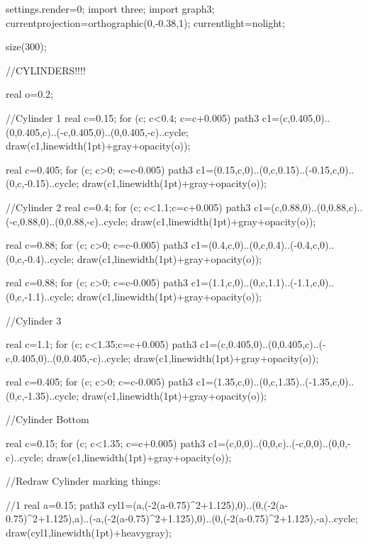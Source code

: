 
  	settings.render=0;
	import three;
    import graph3;
    currentprojection=orthographic(0,-0.38,1);
    currentlight=nolight;

	size(300);
    
    
    //CYLINDERS!!!!
    
    real o=0.2;
    
    //Cylinder 1
   	real c=0.15;
    for (c; c<0.4; c=c+0.005)
    {
        path3 c1=(c,0.405,0)..(0,0.405,c)..(-c,0.405,0)..(0,0.405,-c)..cycle;
    	draw(c1,linewidth(1pt)+gray+opacity(o));
    }
        
   	real c=0.405;
    for (c; c>0; c=c-0.005)
    {
        path3 c1=(0.15,c,0)..(0,c,0.15)..(-0.15,c,0)..(0,c,-0.15)..cycle;
    	draw(c1,linewidth(1pt)+gray+opacity(o));
    }
        
        
     //Cylinder 2
    real c=0.4;
    for (c; c<1.1;c=c+0.005)
    {
        path3 c1=(c,0.88,0)..(0,0.88,c)..(-c,0.88,0)..(0,0.88,-c)..cycle;
    	draw(c1,linewidth(1pt)+gray+opacity(o));
    }
        
   	real c=0.88;
    for (c; c>0; c=c-0.005)
    {
        path3 c1=(0.4,c,0)..(0,c,0.4)..(-0.4,c,0)..(0,c,-0.4)..cycle;
    	draw(c1,linewidth(1pt)+gray+opacity(o));
    }
    	
    real c=0.88;
    for (c; c>0; c=c-0.005)
    {
        path3 c1=(1.1,c,0)..(0,c,1.1)..(-1.1,c,0)..(0,c,-1.1)..cycle;
    	draw(c1,linewidth(1pt)+gray+opacity(o));
    }
        
    //Cylinder 3   
    	
    real c=1.1;
    for (c; c<1.35;c=c+0.005)
    {
        path3 c1=(c,0.405,0)..(0,0.405,c)..(-c,0.405,0)..(0,0.405,-c)..cycle;
    	draw(c1,linewidth(1pt)+gray+opacity(o));
    }
        
    real c=0.405;
    for (c; c>0; c=c-0.005)
    {
        path3 c1=(1.35,c,0)..(0,c,1.35)..(-1.35,c,0)..(0,c,-1.35)..cycle;
    	draw(c1,linewidth(1pt)+gray+opacity(o));
    }
    
    //Cylinder Bottom
    
    real c=0.15;
    for (c; c<1.35; c=c+0.005)
    {
        path3 c1=(c,0,0)..(0,0,c)..(-c,0,0)..(0,0,-c)..cycle;
    	draw(c1,linewidth(1pt)+gray+opacity(o));
    }
    
	//Redraw Cylinder marking things:
	
	//1
	real a=0.15;
		path3 cyl1=(a,(-2(a-0.75)^2+1.125),0)..(0,(-2(a-0.75)^2+1.125),a)..(-a,(-2(a-0.75)^2+1.125),0)..(0,(-2(a-0.75)^2+1.125),-a)..cycle;
    	draw(cyl1,linewidth(1pt)+heavygray);
    	
